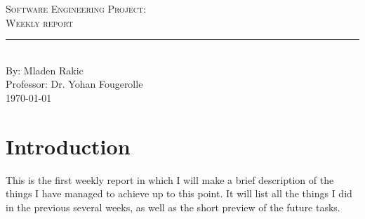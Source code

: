 \documentclass[aps,letterpaper,11pt]{revtex4}
\newcommand{\labno}{Software Engineering Project}
\newcommand{\labtitle}{Weekly report}
\newcommand{\authorname}{Mladen Rakic}
\newcommand{\professor}{Dr. Yohan Fougerolle}
\begin{document}
  
\begin{titlepage}
\begin{center}
{\LARGE \textsc{\labno:} \\ \vspace{4pt}}
{\Large \textsc{\labtitle} \\ \vspace{4pt}} 
\rule[13pt]{\textwidth}{1pt} \\ \vspace{150pt}
{\large By: \authorname \\ \vspace{10pt}
Professor: \professor \\ \vspace{10pt}
\today}
\end{center}


\end{titlepage}%
\newpage
\section {Introduction}
This is the first weekly report in which I will make a brief description of the things I have managed to achieve up to this point. It will list all the things I did in the previous several weeks, as well as the short preview of the future tasks.\\
\end{document}
